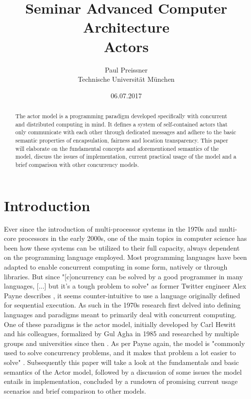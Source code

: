 \documentclass[A4]{article}
\author{Paul Preissner \\ Technische Universit\"at M\"unchen}
\title{Seminar Advanced Computer Architecture \\
       {\bf Actors}
}
\date{06.07.2017}
\begin{document}
\maketitle

\begin{abstract}
The actor model is a programming paradigm developed specifically with concurrent and distributed computing in mind. It defines a system of self-contained actors that only communicate with each other through dedicated messages and adhere to the basic semantic properties of encapsulation, fairness and location transparency. 
This paper will elaborate on the fundamental concepts and aforementioned semantics of the model, discuss the issues of implementation, current practical usage of the model and a brief comparison with other concurrency models. 
\end{abstract}

\section{Introduction}
\label{introduction}
Ever since the introduction of multi-processor systems in the 1970s and multi-core processors in the early 2000s, one of the main topics in computer science has been how these systems can be utilized to their full capacity, always dependent on the programming language employed. 
Most programming languages have been adapted to enable concurrent computing in some form, natively or through libraries. But since "[c]oncurrency can be solved by a good programmer in many languages, [...] but it's a tough problem to solve" as former Twitter engineer Alex Payne describes \cite[p.~15]{Agha2016:2}, it seems counter-intuitive to use a language originally defined for sequential execution. As such in the 1970s research first delved into defining languages and paradigms meant to primarily deal with concurrent computing. One of these paradigms is the actor model, initially developed by Carl Hewitt and his colleagues, formalized by Gul Agha in 1985 and researched by multiple groups and universities since then \cite{reference/parallel/KarmaniA11}. As per Payne again, the model is "commonly used to solve concurrency problems, and it makes that problem a lot easier to solve" \cite[p.~15]{Agha2016:2}.
Subsequently this paper will take a look at the fundamentals and basic semantics of the Actor model, followed by a discussion of some issues the model entails in implementation, concluded by a rundown of promising current usage scenarios and brief comparison to other models. 
\end{document}
